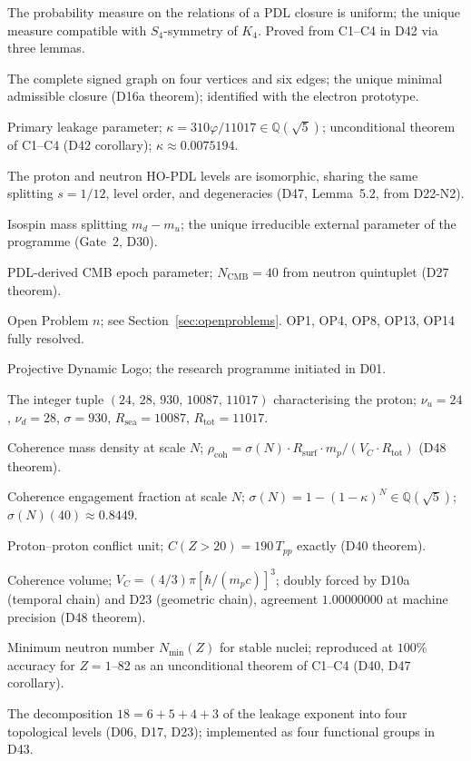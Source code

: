 \documentclass[11pt,a4paper]{article}
\theoremstyle{plain}
\theoremstyle{definition}
\theoremstyle{remark}
\newcommand{\quintuplet}{(24,\,28,\,930,\,10087,\,11017)}
\newcommand{\Rsurf}{R_{\mathrm{surf}}}
\newcommand{\Rtot}{R_{\mathrm{tot}}}
\newcommand{\sigmaN}{\sigma(N)}
\newcommand{\Tpp}{T_{pp}}
\newcommand{\rhocoh}{\rho_{\mathrm{coh}}}
\begin{document}
\begin{description}[leftmargin=3.5cm, style=nextline]
\item[Indifference Lemma (H3)] The probability measure on the relations of a PDL closure is uniform; the unique measure compatible with $S_4$-symmetry of $K_4$. Proved from C1--C4 in D42 via three lemmas.
\item[$K_4$] The complete signed graph on four vertices and six edges; the unique minimal admissible closure (D16a theorem); identified with the electron prototype.
\item[$\kappa$] Primary leakage parameter; $\kappa=310\varphi/11017\in\mathbb{Q}(\sqrt{5})$; unconditional theorem of C1--C4 (D42 corollary); $\kappa\approx 0.0075194$.
\item[Mirror Lemma] The proton and neutron HO-PDL levels are isomorphic, sharing the same splitting $s=1/12$, level order, and degeneracies (D47, Lemma~5.2, from D22-N2).
\item[$m_{\mathrm{iso}}$] Isospin mass splitting $m_d-m_u$; the unique irreducible external parameter of the programme (Gate~2, D30).
\item[$N_{\mathrm{CMB}}$] PDL-derived CMB epoch parameter; $N_{\mathrm{CMB}}=40$ from neutron quintuplet (D27 theorem).
\item[OP$n$] Open Problem $n$; see Section~\ref{sec:openproblems}. OP1, OP4, OP8, OP13, OP14 fully resolved.
\item[PDL] Projective Dynamic Logo; the research programme initiated in D01.
\item[Quintuplet] The integer tuple $\quintuplet$ characterising the proton; $\nu_u=24$, $\nu_d=28$, $\sigma=930$, $R_{\mathrm{sea}}=10087$, $R_{\mathrm{tot}}=11017$.
\item[$\rhocoh(N)$] Coherence mass density at scale $N$; $\rhocoh = \sigmaN\cdot\Rsurf\cdot m_p/(V_C\cdot\Rtot)$ (D48 theorem).
\item[$\sigmaN(N)$] Coherence engagement fraction at scale $N$; $\sigmaN=1-(1-\kappa)^N\in\mathbb{Q}(\sqrt{5})$; $\sigmaN(40)\approx 0.8449$.
\item[$\Tpp$] Proton--proton conflict unit; $C(Z>20)=190\,\Tpp$ exactly (D40 theorem).
\item[$V_C$] Coherence volume; $V_C=(4/3)\pi[\hbar/(m_pc)]^3$; doubly forced by D10a (temporal chain) and D23 (geometric chain), agreement $1.00000000$ at machine precision (D48 theorem).
\item[Valley of stability] Minimum neutron number $N_{\min}(Z)$ for stable nuclei; reproduced at $100\%$ accuracy for $Z=1$--82 as an unconditional theorem of C1--C4 (D40, D47 corollary).
\item[18-filter hierarchy] The decomposition $18=6+5+4+3$ of the leakage exponent into four topological levels (D06, D17, D23); implemented as four functional groups in D43.
\end{description}

\clearpage



\end{document}

